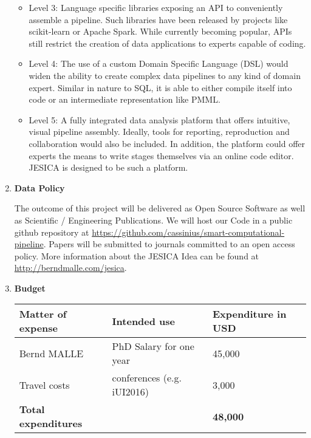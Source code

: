 \documentclass[a4paper,10pt]{article}
\newcommand{\change}[2][1=]{\todo[linecolor=red,backgroundcolor=red!50,bordercolor=red]{#2}}
\begin{document}
\begin{enumerate}
\begin{itemize}
 \item Level 3: Language specific libraries exposing an API to conveniently assemble a pipeline. Such libraries have been released by projects like scikit-learn or Apache Spark. While currently becoming popular, APIs still restrict the creation of data applications to experts capable of coding.

 \item Level 4: The use of a custom Domain Specific Language (DSL) would widen the ability to create complex data pipelines to any kind of domain expert. Similar in nature to SQL, it is able to either compile itself into code or an intermediate representation like PMML.

 \item Level 5: A fully integrated data analysis platform that offers intuitive, visual pipeline assembly. Ideally, tools for reporting, reproduction and collaboration would also be included. In addition, the platform could offer experts the means to write stages themselves via an online code editor. JESICA is designed to be such a platform.
\end{itemize}


\item \textbf{Data Policy}

The outcome of this project will be delivered as Open Source Software as well as Scientific / Engineering Publications. We will host our Code in a public github repository at \url{https://github.com/cassinius/smart-computational-pipeline}. Papers will be submitted to journals committed to an open access policy. More information about the JESICA Idea can be found at \url{http://berndmalle.com/jesica}.


\item \textbf{Budget}
\begin{table}[H]
  \begin{adjustwidth}{0.9cm}{}
    \begin{tabular}{| p{4cm} | p{5.7cm} | >{\hfill}p{4cm}|}
    \hline
    \rowcolor{Gray}
    \textbf{Matter of expense} & \textbf{Intended use} & \textbf{Expenditure in USD} \\ \hline
    Bernd MALLE & PhD Salary for one year  & 45,000 \\ \hline
    Travel costs & conferences (e.g. iUI2016) & 3,000  \\ \hline
    \textbf{Total expenditures} & & \textbf{48,000} \\ \hline
    \end{tabular}
  \end{adjustwidth}
\end{table}


\end{enumerate}

{\footnotesize

}
\end{document}
